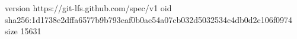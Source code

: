 version https://git-lfs.github.com/spec/v1
oid sha256:1d1738e2dffa6577b9b793eaf0b0ae54a07cb032d5032534c4db0d2c106f0974
size 15631
